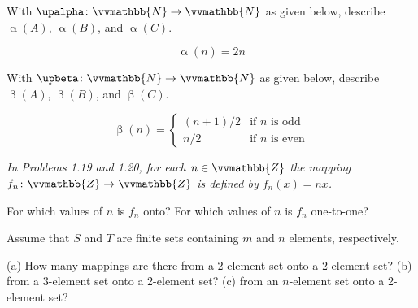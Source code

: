 \documentclass{exam}
\begin{document}
\begin{questions}
    \question With \( \upalpha \colon \vvmathbb{N} \to \vvmathbb{N} \) as given below, describe \( \upalpha \left( A \right) \), \( \upalpha \left( B \right) \), and \( \upalpha \left( C \right) \).

    \[
        \upalpha \left( n \right) = 2n
    \]

    \question With \( \upbeta \colon \vvmathbb{N} \to \vvmathbb{N} \) as given below, describe \( \upbeta \left( A \right) \), \( \upbeta \left( B \right) \), and \( \upbeta \left( C \right) \).

    \[
        \upbeta \left( n \right) = \begin{cases}
            \left( n + 1 \right)/2 & \text{if } n \text{ is odd} \\
            n/2 & \text{if } n \text{ is even}
        \end{cases}
    \]

    \vspace{0.6cm}

    \textit{In Problems 1.19 and 1.20, for each \( n \in \vvmathbb{Z} \) the mapping \( f_n \colon \vvmathbb{Z} \to \vvmathbb{Z} \) is defined by \( f_n \left( x \right) = nx \).}

    \question For which values of \( n \) is \( f_n \) onto?
    \question For which values of \( n \) is \( f_n \) one-to-one?

    \vspace{0.6cm}

    \question Assume that \( S \) and \( T \) are finite sets containing \( m \) and \( n \) elements, respectively.


    \vspace{0.3cm}

    \question (a) How many mappings are there from a 2-element set onto a 2-element set? (b) from a 3-element set onto a 2-element set? (c) from an \( n \)-element set onto a 2-element set?


\end{questions}
\end{document}
